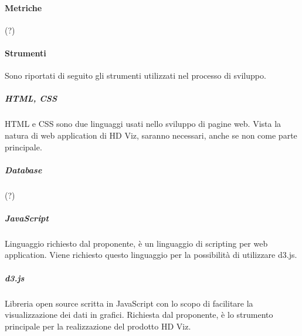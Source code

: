 \documentclass[../norme-di-progetto.tex]{subfiles}
\begin{document}
 \paragraph{Metriche}
 (?)
 
 \paragraph{Strumenti}
 Sono riportati di seguito gli strumenti utilizzati nel processo di sviluppo.
 
 \subparagraph{HTML, CSS}
 HTML e CSS sono due linguaggi usati nello sviluppo di pagine web. Vista la natura di web application di HD Viz, saranno necessari, anche se non come parte principale.
 
 \subparagraph{Database}
 (?)
 
 \subparagraph{JavaScript}
 Linguaggio richiesto dal proponente, è un linguaggio di scripting per web application. Viene richiesto questo linguaggio per la possibilità di utilizzare d3.js.
 
 \subparagraph{d3.js}
 Libreria open source scritta in JavaScript con lo scopo di facilitare la visualizzazione dei dati in grafici. Richiesta dal proponente, è lo strumento principale per la realizzazione del prodotto HD Viz.
 
\end{document}
